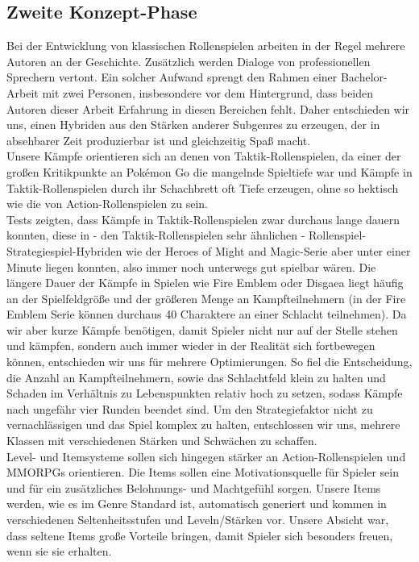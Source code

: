 \documentclass[extern,palatino]{cgBA}
\begin{document}
\subsection{Zweite Konzept-Phase}
Bei der Entwicklung von klassischen Rollenspielen arbeiten in der Regel mehrere Autoren an der Geschichte. Zusätzlich werden Dialoge von professionellen Sprechern vertont. Ein solcher Aufwand sprengt den Rahmen einer Bachelor-Arbeit mit zwei Personen, insbesondere vor dem Hintergrund, dass beiden Autoren dieser Arbeit Erfahrung in diesen Bereichen fehlt. Daher entschieden wir uns, einen Hybriden aus den Stärken anderer Subgenres zu erzeugen, der in absehbarer Zeit produzierbar ist und gleichzeitig Spaß macht. 
\\Unsere Kämpfe orientieren sich an denen von Taktik-Rollenspielen, da einer der großen Kritikpunkte an Pokémon Go die mangelnde Spieltiefe war und Kämpfe in Taktik-Rollenspielen durch ihr Schachbrett oft Tiefe erzeugen, ohne so hektisch wie die von Action-Rollenspielen zu sein. 
\\Tests zeigten, dass Kämpfe in Taktik-Rollenspielen zwar durchaus lange dauern konnten, diese in - den Taktik-Rollenspielen sehr ähnlichen - Rollenspiel-Strategiespiel-Hybriden wie der Heroes of Might and Magic-Serie aber unter einer Minute liegen konnten, also immer noch unterwegs gut spielbar wären. Die längere Dauer der Kämpfe in Spielen wie Fire Emblem oder Disgaea liegt häufig an der Spielfeldgröße und der größeren Menge an Kampfteilnehmern (in der Fire Emblem Serie können durchaus 40 Charaktere an einer Schlacht teilnehmen). Da wir aber kurze Kämpfe benötigen, damit Spieler nicht nur auf der Stelle stehen und kämpfen, sondern auch immer wieder in der Realität sich fortbewegen können, entschieden wir uns für mehrere Optimierungen. So fiel die Entscheidung, die Anzahl an Kampfteilnehmern, sowie das Schlachtfeld klein zu halten und Schaden im Verhältnis zu Lebenspunkten relativ hoch zu setzen, sodass Kämpfe nach ungefähr vier Runden beendet sind. Um den Strategiefaktor nicht zu vernachlässigen und das Spiel komplex zu halten, entschlossen wir uns, mehrere Klassen mit verschiedenen Stärken und Schwächen zu schaffen.
\\Level- und Itemsysteme sollen sich hingegen stärker an Action-Rollenspielen und MMORPGs orientieren. Die Items sollen eine Motivationsquelle für Spieler sein und für ein zusätzliches Belohnungs- und Machtgefühl sorgen. 
Unsere Items werden, wie es im Genre Standard ist, automatisch generiert und kommen in verschiedenen Seltenheitsstufen und Leveln/Stärken vor. Unsere Absicht war, dass seltene Items große Vorteile bringen, damit Spieler sich besonders freuen, wenn sie sie erhalten.
\end{document}
